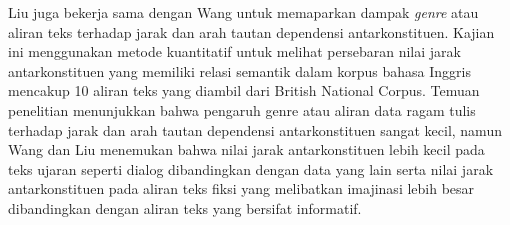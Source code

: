 Liu juga bekerja sama dengan Wang \citep{wang2017effects} untuk memaparkan dampak \textit{genre} atau aliran teks terhadap jarak dan arah tautan dependensi antarkonstituen. Kajian ini menggunakan metode kuantitatif untuk melihat persebaran nilai jarak antarkonstituen yang memiliki relasi semantik dalam korpus bahasa Inggris mencakup 10 aliran teks yang diambil dari British National Corpus. Temuan penelitian menunjukkan bahwa pengaruh genre atau aliran data ragam tulis terhadap jarak dan arah tautan dependensi antarkonstituen sangat kecil, namun Wang dan Liu menemukan bahwa nilai jarak antarkonstituen lebih kecil pada teks ujaran seperti dialog dibandingkan dengan data yang lain serta nilai jarak antarkonstituen pada aliran teks fiksi yang melibatkan imajinasi lebih besar dibandingkan dengan aliran teks yang bersifat informatif.

